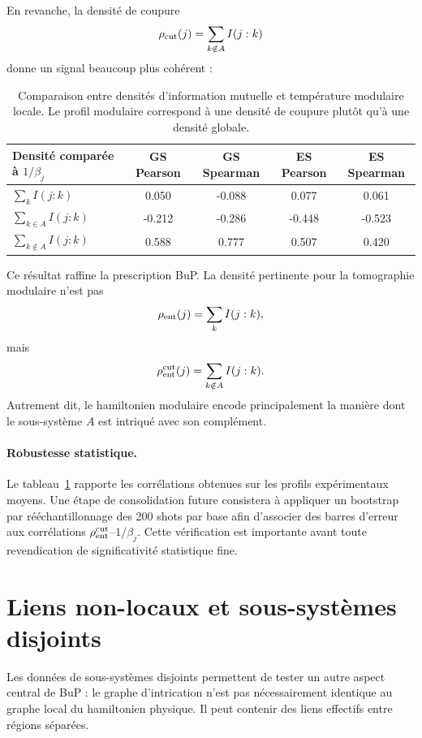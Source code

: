 \documentclass[11pt,a4paper]{article}
\begin{document}
En revanche, la densité de coupure
\[
\rho_{\rm cut}(j)=\sum_{k\notin A}I(j:k)
\]
donne un signal beaucoup plus cohérent :

\begin{table}[h]
\centering
\begin{tabular}{lcccc}
\toprule
Densité comparée à $1/\beta_j$ & GS Pearson & GS Spearman & ES Pearson & ES Spearman \\
\midrule
$\sum_k I(j:k)$ & 0.050 & -0.088 & 0.077 & 0.061 \\
$\sum_{k\in A}I(j:k)$ & -0.212 & -0.286 & -0.448 & -0.523 \\
$\sum_{k\notin A}I(j:k)$ & 0.588 & 0.777 & 0.507 & 0.420 \\
\bottomrule
\end{tabular}
\caption{Comparaison entre densités d'information mutuelle et température modulaire locale. Le profil modulaire correspond à une densité de coupure plutôt qu'à une densité globale.}
\label{tab:cut_density}
\end{table}

Ce résultat raffine la prescription BuP. La densité pertinente pour la tomographie modulaire n'est pas
\[
\rho_{\rm ent}(j)=\sum_k I(j:k),
\]
mais
\[
\rho_{\rm ent}^{\rm cut}(j)
=
\sum_{k\notin A}I(j:k).
\]
Autrement dit, le hamiltonien modulaire encode principalement la manière dont le sous-système $A$ est intriqué avec son complément.

\paragraph{Robustesse statistique.}
Le tableau~\ref{tab:cut_density} rapporte les corrélations obtenues sur les profils expérimentaux moyens. Une étape de consolidation future consistera à appliquer un bootstrap par rééchantillonnage des 200 shots par base afin d'associer des barres d'erreur aux corrélations $\rho_{\rm ent}^{\rm cut}$--$1/\beta_j$. Cette vérification est importante avant toute revendication de significativité statistique fine.


\section{Liens non-locaux et sous-systèmes disjoints}

Les données de sous-systèmes disjoints permettent de tester un autre aspect central de BuP : le graphe d'intrication n'est pas nécessairement identique au graphe local du hamiltonien physique. Il peut contenir des liens effectifs entre régions séparées.
\end{document}
